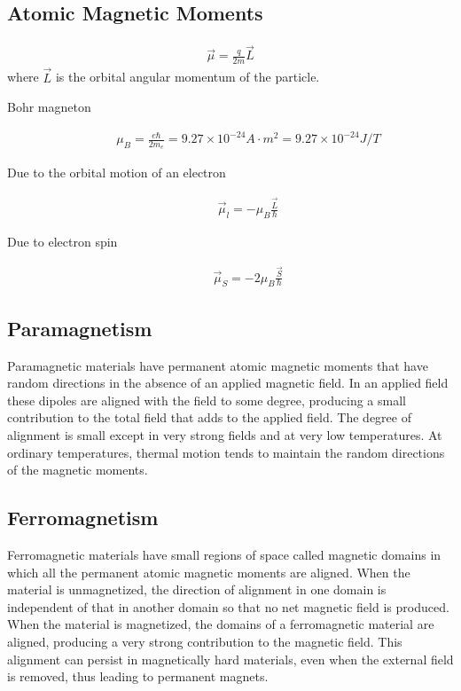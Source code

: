 \documentclass[../main.tex]{subfiles}
\begin{document}
\subsection{Atomic Magnetic Moments}
\label{sub:atomic_magnetic_moments}

\begin{align}
  \vec{\mu} = \frac{q}{2m}\vec{L}
\end{align}
where $\vec{L}$ is the orbital angular momentum of the particle.

\begin{description}
  \item[Bohr magneton]
    \begin{align}
      \mu_B = \frac{e\hbar}{2m_e} = 9.27\times10^{-24}A\cdot m^2 =
      9.27\times10^{-24}J/T
    \end{align}
  \item[Due to the orbital motion of an electron]
    \begin{align}
      \vec{\mu}_l = -\mu_B\frac{\vec{L}}{\hbar}
    \end{align}
  \item[Due to electron spin]
    \begin{align}
      \vec{\mu}_S = -2\mu_B\frac{\vec{S}}{\hbar}
    \end{align}
\end{description}

\subsection{Paramagnetism}
\label{sub:paramagnetism}

Paramagnetic materials have permanent atomic magnetic moments that have random
directions in the absence of an applied magnetic field. In an applied field
these dipoles are aligned with the field to some degree, producing a small
contribution to the total field that adds to the applied field. The degree of
alignment is small except in very strong fields and at very low temperatures.
At ordinary temperatures, thermal motion tends to maintain the random
directions of the magnetic moments.

\subsection{Ferromagnetism}
\label{sub:ferromagnetism}

Ferromagnetic materials have small regions of space called magnetic domains in
which all the permanent atomic magnetic moments are aligned. When the material
is unmagnetized, the direction of alignment in one domain is independent of
that in another domain so that no net magnetic field is produced. When the
material is magnetized, the domains of a ferromagnetic material are aligned,
producing a very strong contribution to the magnetic field. This alignment can
persist in magnetically hard materials, even when the external field is
removed, thus leading to permanent magnets.
\end{document}
